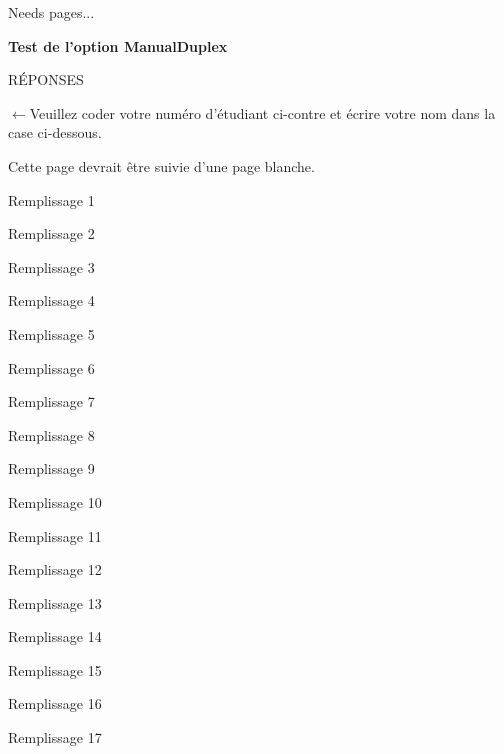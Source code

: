 \documentclass{article}
\begin{document}
{\begin{multicols}{2}
  Needs \the\calculs{} pages...
\end{multicols}
\AMCaddpagesto{\calculs}
\clearpage

\AMCformBegin
\begin{center}\bf\large Test de l'option ManualDuplex

RÉPONSES\end{center}

{\setlength{\parindent}{0pt}\hspace*{\fill}\hspace*{\fill}\begin{minipage}[b]{5.8cm}$\longleftarrow{}$\hspace{0pt plus 1cm}Veuillez coder votre numéro d'étudiant ci-contre et écrire votre nom dans la case ci-dessous.\vspace{3ex}

\hfill{}\hfill\vspace{5ex}\end{minipage}\hspace*{\fill}

}\vspace{4mm}
Cette page devrait être suivie d'une page blanche.

Remplissage 1

Remplissage 2

Remplissage 3

Remplissage 4

Remplissage 5

Remplissage 6

Remplissage 7

Remplissage 8

Remplissage 9

Remplissage 10

Remplissage 11

Remplissage 12

Remplissage 13

Remplissage 14

Remplissage 15

Remplissage 16

Remplissage 17

}
\end{document}

